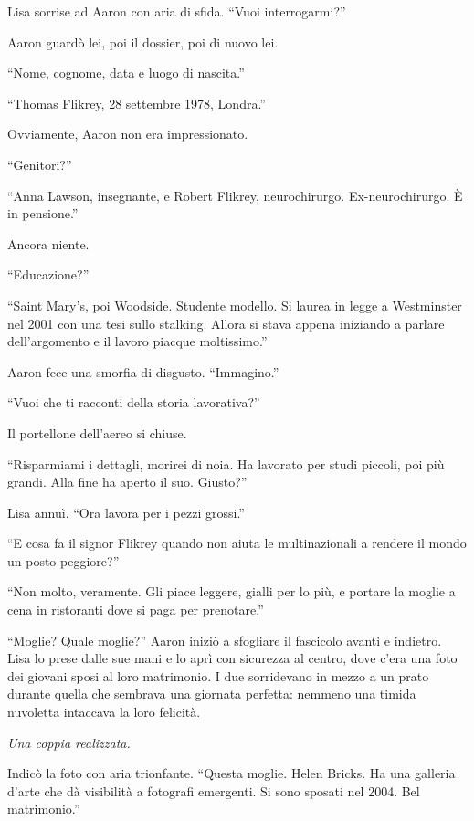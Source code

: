 Lisa sorrise ad Aaron con aria di sfida. ``Vuoi interrogarmi?''

Aaron guardò lei, poi il dossier, poi di nuovo lei.

``Nome, cognome, data e luogo di nascita.''

``Thomas Flikrey, 28 settembre 1978, Londra.''

Ovviamente, Aaron non era impressionato.

``Genitori?''

``Anna Lawson, insegnante, e Robert Flikrey, neurochirurgo. Ex-neurochirurgo. È in pensione.''

Ancora niente.

``Educazione?''


``Saint Mary's, poi Woodside. Studente modello. Si laurea in legge a Westminster nel 2001 con una
tesi sullo stalking. Allora si stava appena iniziando a parlare dell'argomento e il lavoro piacque
moltissimo.''

Aaron fece una smorfia di disgusto. ``Immagino.''

``Vuoi che ti racconti della storia lavorativa?''

Il portellone dell'aereo si chiuse.

``Risparmiami i dettagli, morirei di noia. Ha lavorato per studi piccoli, poi più grandi. Alla fine
ha aperto il suo. Giusto?''

Lisa annuì. ``Ora lavora per i pezzi grossi.''

``E cosa fa il signor Flikrey quando non aiuta le multinazionali a rendere il mondo un posto
peggiore?''

``Non molto, veramente. Gli piace leggere, gialli per lo più, e portare la moglie a cena in
ristoranti dove si paga per prenotare.''

``Moglie? Quale moglie?'' Aaron iniziò a sfogliare il fascicolo avanti e indietro. Lisa lo prese
dalle sue mani e lo aprì con sicurezza al centro, dove c'era una foto dei giovani sposi al loro
matrimonio. I due sorridevano in mezzo a un prato durante quella che sembrava una giornata perfetta:
nemmeno una timida nuvoletta intaccava la loro felicità.

\emph{Una coppia realizzata.}

Indicò la foto con aria trionfante. ``Questa moglie. Helen Bricks. Ha una galleria d'arte che dà
visibilità a fotografi emergenti. Si sono sposati nel 2004. Bel matrimonio.''

